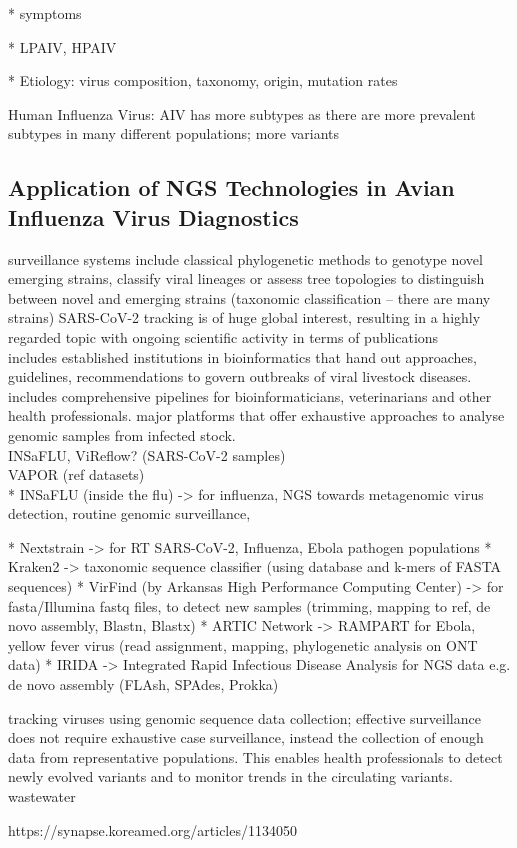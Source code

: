 * symptoms

* LPAIV, HPAIV

* Etiology: virus composition, taxonomy, origin, mutation rates

Human Influenza Virus:
AIV has more subtypes as there are more prevalent subtypes in many different populations; more variants

\subsection{Application of NGS Technologies in Avian Influenza Virus Diagnostics}
surveillance systems include classical phylogenetic methods to genotype novel emerging strains, classify viral lineages or assess tree topologies to distinguish between novel and emerging strains (taxonomic classification -- there are many strains)
SARS-CoV-2 tracking is of huge global interest, resulting in a highly regarded topic with ongoing scientific activity in terms of publications \\
includes established institutions in bioinformatics that hand out approaches, guidelines, recommendations to govern outbreaks of viral livestock diseases. includes comprehensive pipelines for bioinformaticians, veterinarians and other health professionals.
major platforms that offer exhaustive approaches to analyse genomic samples from infected stock. \\

INSaFLU, ViReflow? (SARS-CoV-2 samples) \\
 VAPOR (ref datasets) \\

* INSaFLU (inside the flu) -> for influenza, NGS towards metagenomic virus detection, routine genomic surveillance, 

* Nextstrain -> for RT SARS-CoV-2, Influenza, Ebola pathogen populations 
* Kraken2 -> taxonomic sequence classifier (using database and k-mers of FASTA sequences)
* VirFind (by Arkansas High Performance Computing Center) -> for fasta/Illumina fastq files, to detect new samples (trimming, mapping to ref, de novo assembly, Blastn, Blastx)
* ARTIC Network -> RAMPART for Ebola, yellow fever virus (read assignment, mapping, phylogenetic analysis on ONT data)
* IRIDA -> Integrated Rapid Infectious Disease Analysis for NGS data e.g. de novo assembly (FLAsh, SPAdes, Prokka)


tracking viruses using genomic sequence data collection; effective surveillance does not require exhaustive case surveillance, instead the collection of enough data from representative populations. This enables health professionals to detect newly evolved variants and to monitor trends in the circulating variants.\\
wastewater

https://synapse.koreamed.org/articles/1134050